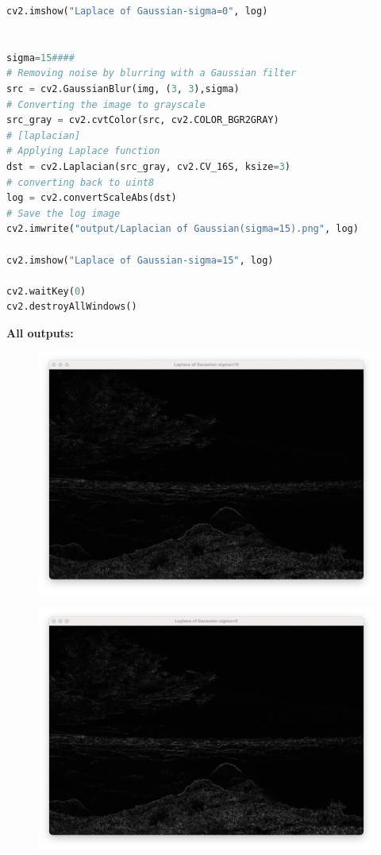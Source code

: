 \documentclass[a4paper, 12pt]{report}
\begin{document}
\begin{lstlisting}[language=Python]
cv2.imshow("Laplace of Gaussian-sigma=0", log)


sigma=15####
# Removing noise by blurring with a Gaussian filter
src = cv2.GaussianBlur(img, (3, 3),sigma)
# Converting the image to grayscale
src_gray = cv2.cvtColor(src, cv2.COLOR_BGR2GRAY)
# [laplacian]
# Applying Laplace function
dst = cv2.Laplacian(src_gray, cv2.CV_16S, ksize=3)
# converting back to uint8
log = cv2.convertScaleAbs(dst)
# Save the log image
cv2.imwrite("output/Laplacian of Gaussian(sigma=15).png", log)

cv2.imshow("Laplace of Gaussian-sigma=15", log)

cv2.waitKey(0)
cv2.destroyAllWindows()

\end{lstlisting}
\newpage
\textbf{All outputs:}
\\
\begin{figure}[h]
\includegraphics[scale=.39]{1.png}
\centering
\end{figure}
\begin{figure}
\includegraphics[scale=.39]{2.png}
\centering
\end{figure}
\end{document}
